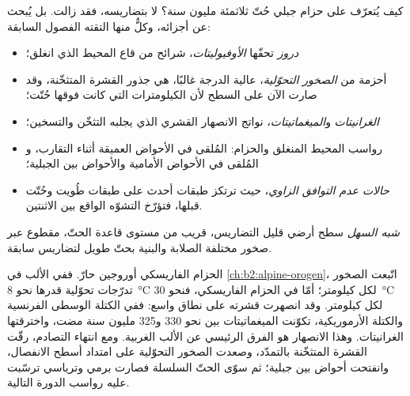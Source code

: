 كيف يُتعرّف على حزام جبلي حُتّ ثلاثمئة مليون سنة؟
لا بتضاريسه، فقد زالت. بل يُبحث عن أجزائه، وكلٌّ منها التقته الفصول
السابقة:
\begin{itemize}
\item \emph{دروز} تحفّها \emph{الأوفيوليتات}، شرائح من قاع المحيط الذي انغلق؛
\item أحزمة من \emph{الصخور التحوّلية}، عالية الدرجة غالبًا، هي جذور القشرة المتثخّنة،
وقد صارت الآن على السطح لأن الكيلومترات التي كانت فوقها حُتّت؛
\item \emph{الغرانيتات} و\emph{الميغماتيتات}، نواتج الانصهار القشري الذي
يجلبه التثخّن والتسخين؛
\item رواسب المحيط المنغلق والحزام: \emph{} المُلقى في الأحواض العميقة
أثناء التقارب، و\emph{} المُلقى في الأحواض الأمامية والأحواض بين الجبلية؛
\item \emph{حالات عدم التوافق الزاوي}، حيث ترتكز طبقات أحدث على طبقات طُويت
وحُتّت قبلها، فتؤرّخ التشوّه الواقع بين الاثنتين.
\end{itemize}

\begin{definition}\label{def:b2:wilson-cycle:peneplain}
\emph{شبه السهل} سطح أرضي قليل التضاريس، قريب من مستوى قاعدة
الحتّ، مقطوع عبر صخور مختلفة الصلابة والبنية بحتّ طويل لتضاريس
سابقة.
\end{definition}

الحزام الفاريسكي أوروجين حارّ. ففي الألب في \cref{ch:b2:alpine-orogen}، اتّبعت الصخور
تدرّجات تحوّلية قدرها نحو \qty{8}{\celsius} لكل كيلومتر؛ أمّا في الحزام الفاريسكي،
فنحو \qty{30}{\celsius} لكل كيلومتر. وقد انصهرت قشرته على نطاق واسع: ففي الكتلة الوسطى الفرنسية
والكتلة الأرموريكية، تكوّنت الميغماتيتات بين نحو 330 و325 مليون سنة مضت،
واخترقتها الغرانيتات. وهذا الانصهار هو الفرق الرئيسي عن الألب الغربية. ومع
انتهاء التصادم، رقّت القشرة المتثخّنة بالتمدّد، وصعدت الصخور التحوّلية
على امتداد أسطح الانفصال، وانفتحت أحواض بين جبلية؛ ثم سوّى الحتّ السلسلة فصارت
 برمي وترياسي ترسّبت عليه رواسب الدورة التالية.

